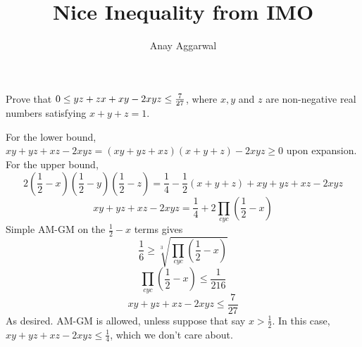 \documentclass[11pt]{article}
\title{Nice Inequality from IMO}
\author{Anay Aggarwal}
\begin{document}
\maketitle
\begin{example}
  [IMO 1984]
  Prove that $0\le yz+zx+xy-2xyz\le{7\over27}$, where $x,y$ and $z$ are non-negative real numbers satisfying $x+y+z=1$.
\end{example}
\begin{soln}
  For the lower bound, $xy+yz+xz-2xyz=(xy+yz+xz)(x+y+z)-2xyz\ge 0$ upon expansion.
  For the upper bound,
  $$2\left(\frac{1}{2}-x\right)\left(\frac{1}{2}-y\right)\left(\frac{1}{2}-z\right)=\frac{1}{4}-\frac{1}{2}(x+y+z)+xy+yz+xz-2xyz$$
  $$xy+yz+xz-2xyz=\frac{1}{4}+2\prod_{cyc}\left(\frac{1}{2}-x\right)$$
  Simple AM-GM on the $\frac{1}{2}-x$ terms gives
  $$\frac{1}{6}\ge \sqrt[3]{\prod_{cyc}\left(\frac{1}{2}-x\right)}$$
  $$\prod_{cyc}\left(\frac{1}{2}-x\right)\le \frac{1}{216}$$
  $$xy+yz+xz-2xyz\le \frac{7}{27}$$
  As desired. AM-GM is allowed, unless suppose that say $x>\frac{1}{2}$.
  In this case, $xy+yz+xz-2xyz\le \frac{1}{4}$, which we don't care about.
\end{soln}
\end{document}
